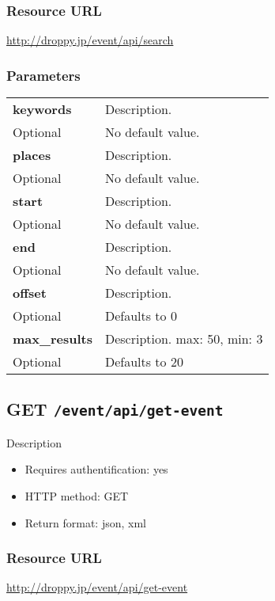 \documentclass[11pt,a4paper]{article}
\newcommand{\content}[1]{\begin{minipage}{10cm}\vspace{2mm}#1\vspace{2mm}\end{minipage}}
\begin{document}
  \subsubsection*{Resource URL}
  \url{http://droppy.jp/event/api/search}
  \subsubsection*{Parameters}
  \begin{table}[h]
    \begin{center}
      \begin{tabular}{l l}
        \hline 
      \textbf{keywords} & \content{Description. }
      \\
      Optional & No default value.\\
      \hline
      \textbf{places} & \content{Description. }
      \\
      Optional & No default value.\\
      \hline
      \textbf{start} & \content{Description. }
      \\
      Optional & No default value.\\
      \hline
      \textbf{end} & \content{Description. }
      \\
      Optional & No default value.\\
      \hline
      \textbf{offset} & \content{Description. }
      \\
      Optional & Defaults to 0\\
      \hline
      \textbf{max\_results} & \content{Description. max: 50, min: 3}
      \\
      Optional & Defaults to 20\\
      \hline
      \end{tabular}
    \end{center}
  \end{table}
  
      \newpage
      
      
  \subsection*{GET {\tt /event/api/get-event}}
  Description
  \begin{itemize}
  \item Requires authentification: yes
  \item HTTP method: GET
  \item Return format: json, xml
  \end{itemize}
  \subsubsection*{Resource URL}
  \url{http://droppy.jp/event/api/get-event}
\end{document}
